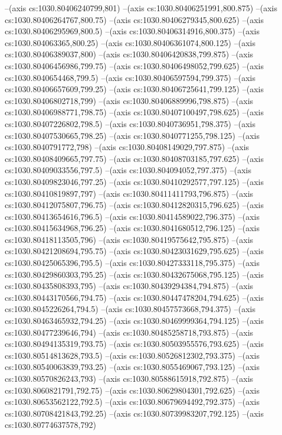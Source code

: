 --(axis cs:1030.80406240799,801)
--(axis cs:1030.80406251991,800.875)
--(axis cs:1030.80406264767,800.75)
--(axis cs:1030.80406279345,800.625)
--(axis cs:1030.80406295969,800.5)
--(axis cs:1030.80406314916,800.375)
--(axis cs:1030.804063365,800.25)
--(axis cs:1030.80406361074,800.125)
--(axis cs:1030.80406389037,800)
--(axis cs:1030.80406420838,799.875)
--(axis cs:1030.80406456986,799.75)
--(axis cs:1030.80406498052,799.625)
--(axis cs:1030.8040654468,799.5)
--(axis cs:1030.80406597594,799.375)
--(axis cs:1030.80406657609,799.25)
--(axis cs:1030.80406725641,799.125)
--(axis cs:1030.80406802718,799)
--(axis cs:1030.80406889996,798.875)
--(axis cs:1030.80406988771,798.75)
--(axis cs:1030.80407100497,798.625)
--(axis cs:1030.80407226802,798.5)
--(axis cs:1030.8040736951,798.375)
--(axis cs:1030.80407530665,798.25)
--(axis cs:1030.8040771255,798.125)
--(axis cs:1030.8040791772,798)
--(axis cs:1030.80408149029,797.875)
--(axis cs:1030.80408409665,797.75)
--(axis cs:1030.80408703185,797.625)
--(axis cs:1030.80409033556,797.5)
--(axis cs:1030.804094052,797.375)
--(axis cs:1030.80409823046,797.25)
--(axis cs:1030.80410292577,797.125)
--(axis cs:1030.80410819897,797)
--(axis cs:1030.80411411793,796.875)
--(axis cs:1030.80412075807,796.75)
--(axis cs:1030.80412820315,796.625)
--(axis cs:1030.80413654616,796.5)
--(axis cs:1030.80414589022,796.375)
--(axis cs:1030.80415634968,796.25)
--(axis cs:1030.8041680512,796.125)
--(axis cs:1030.80418113505,796)
--(axis cs:1030.80419575642,795.875)
--(axis cs:1030.80421208694,795.75)
--(axis cs:1030.80423031629,795.625)
--(axis cs:1030.80425065396,795.5)
--(axis cs:1030.80427333118,795.375)
--(axis cs:1030.80429860303,795.25)
--(axis cs:1030.80432675068,795.125)
--(axis cs:1030.80435808393,795)
--(axis cs:1030.80439294384,794.875)
--(axis cs:1030.80443170566,794.75)
--(axis cs:1030.80447478204,794.625)
--(axis cs:1030.8045226264,794.5)
--(axis cs:1030.80457573668,794.375)
--(axis cs:1030.80463465932,794.25)
--(axis cs:1030.80469999364,794.125)
--(axis cs:1030.80477239646,794)
--(axis cs:1030.80485258718,793.875)
--(axis cs:1030.80494135319,793.75)
--(axis cs:1030.80503955576,793.625)
--(axis cs:1030.80514813628,793.5)
--(axis cs:1030.80526812302,793.375)
--(axis cs:1030.80540063839,793.25)
--(axis cs:1030.8055469067,793.125)
--(axis cs:1030.80570826243,793)
--(axis cs:1030.80588615918,792.875)
--(axis cs:1030.8060821791,792.75)
--(axis cs:1030.80629804301,792.625)
--(axis cs:1030.80653562122,792.5)
--(axis cs:1030.80679694492,792.375)
--(axis cs:1030.80708421843,792.25)
--(axis cs:1030.80739983207,792.125)
--(axis cs:1030.80774637578,792)
